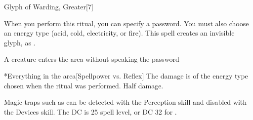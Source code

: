 \begin{spellsection}{Glyph of Warding, Greater}[7]
    \begin{spellheader}
    \end{spellheader}
    \begin{spellcontent}
        \begin{spelltargetinginfo}
        \end{spelltargetinginfo}
        \begin{spelleffects}

            \spellspecial When you perform this ritual, you can specify a password. You must also choose an energy type (acid, cold, electricity, or fire).
            \spelleffect This spell creates an invisible glyph, as .
            \begin{spelltrigger}{A creature enters the area without speaking the password}
                \begin{spelltargets}*{Everything in the area}[Spellpower vs. Reflex]
                    \spellsuccess \spelldamage[d8] The damage is of the energy type chosen when the ritual was performed.
                    \spellfailure Half damage.
                \end{spelltargets}
            \end{spelltrigger}
        \end{spelleffects}
    \end{spellcontent}
    \begin{spellfooter}
        \spellnotes Magic traps such as  can be detected with the Perception skill and disabled with the Devices skill. The DC is 25 \add spell level, or DC 32 for .
    \end{spellfooter}
\end{spellsection}

